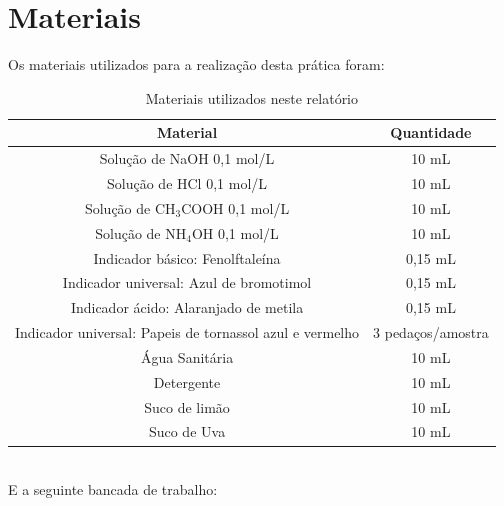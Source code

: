 
\section{Materiais}\label{sec:mat_materiais}
    \indent Os materiais utilizados para a realização desta prática foram:
        \begin{table}[h]
        \label{tab:materiais}
        \centering
        \begin{tabular}{|c|c|}
            \hline
            \textbf{Material} & \textbf{Quantidade} \\
            \hline
            Solução de NaOH 0,1 mol/L & 10 mL \\
            \hline
            Solução de HCl 0,1 mol/L & 10 mL \\
            \hline
            Solução de CH$_3$COOH 0,1 mol/L & 10 mL \\
            \hline
            Solução de NH$_4$OH 0,1 mol/L & 10 mL \\
            \hline
            Indicador básico: Fenolftaleína & 0,15 mL \\
            \hline
            Indicador universal: Azul de bromotimol & 0,15 mL \\
            \hline
            Indicador ácido: Alaranjado de metila & 0,15 mL \\
            \hline
            Indicador universal: Papeis de tornassol azul e vermelho & 3 pedaços/amostra \\
            \hline
            Água Sanitária & 10 mL \\
            \hline
            Detergente & 10 mL \\
            \hline
            Suco de limão & 10 mL \\
            \hline
            Suco de Uva & 10 mL \\
            \hline
        \end{tabular}
            \caption{Materiais utilizados neste relatório}
    \end{table}\\
    \newpage
    \indent E a seguinte bancada de trabalho:\\
